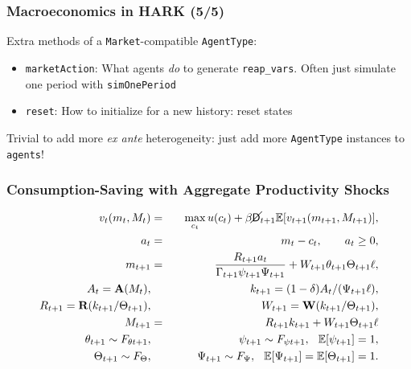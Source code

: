 \documentclass[11pt,handout]{beamer}
\newcommand{\E}{\mathbb{E}}
\newcommand{\bi}{\begin{itemize}}
\newcommand{\ei}{\end{itemize}}
\newcommand{\Die}{\mathsf{D}}
\newcommand{\Live}{\cancel{\Die}}
\begin{document}
\begin{frame}
\frametitle{Macroeconomics in HARK (5/5)}
Extra methods of a \texttt{Market}-compatible \texttt{AgentType}:
\bi
\item \texttt{marketAction}: What agents \textit{do} to generate \texttt{reap\_vars}.  Often just simulate one period with \texttt{simOnePeriod}

\item \texttt{reset}: How to initialize for a new history: reset states
\ei

Trivial to add more \textit{ex ante} heterogeneity: just add more \texttt{AgentType} instances to \texttt{agents}!
\end{frame}



\begin{frame}
\frametitle{Consumption-Saving with Aggregate Productivity Shocks}
\begin{eqnarray*}
v_t(m_t,M_t) &=& \max_{c_t} u(c_t) + \beta \Live_{t+1} \E [v_{t+1}(m_{t+1},M_{t+1}) ], \\
a_t &=& m_t - c_t, \qquad a_t \geq 0, \\
m_{t+1} &=& \frac{R_{t+1} a_t}{\Gamma_{t+1}\psi_{t+1} \Psi_{t+1}}  + W_{t+1} \theta_{t+1} \Theta_{t+1} \ell, \\
A_t = \textbf{A}({M_t}),  & & k_{t+1} = (1-\delta)A_t/(\Psi_{t+1} \ell), \\
R_{t+1} = \textbf{R}(k_{t+1}/\Theta_{t+1}), & & W_{t+1} = \textbf{W}(k_{t+1}/\Theta_{t+1}), \\
M_{t+1} &=& R_{t+1} k_{t+1} + W_{t+1} \Theta_{t+1} \ell \\
\theta_{t+1} \sim F_{\theta t+1}, &\qquad& \psi_{t+1} \sim F_{\psi t+1}, \hspace{0.25cm} \E[\psi_{t+1}] = 1, \\
\Theta_{t+1} \sim F_{\Theta}, &\qquad& \Psi_{t+1} \sim F_{\Psi}, \hspace{0.25cm} \E[\Psi_{t+1}] = \E[\Theta_{t+1}] = 1.
\end{eqnarray*}
\end{frame}
\end{document}

